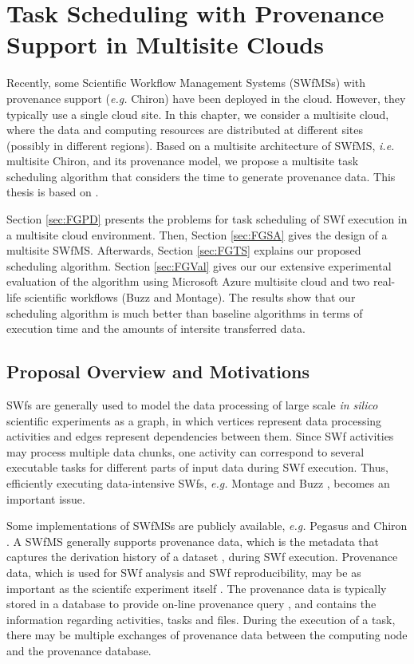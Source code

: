 \chapter{Task Scheduling with Provenance Support in Multisite Clouds} \label{SWSPSMC}

Recently, some Scientific Workflow Management Systems (SWfMSs) with provenance support (\textit{e.g.} Chiron) have been deployed in the cloud.
However,  they typically use a single cloud site. In this chapter, we consider a multisite cloud, where the data and computing resources are distributed at different sites (possibly in different regions).
Based on a multisite architecture of SWfMS, \textit{i.e.} multisite Chiron, and its provenance model, we propose a multisite task scheduling algorithm that considers the time to generate provenance data. This thesis is based on \cite{Liu2016}.

Section \ref{sec:FGPD} presents the problems for task scheduling of SWf execution in a multisite cloud environment. 
Then, Section \ref{sec:FGSA} gives the design of a multisite SWfMS. 
Afterwards, Section \ref{sec:FGTS} explains our proposed scheduling algorithm. 
Section \ref{sec:FGVal} gives our our extensive experimental evaluation of the algorithm using Microsoft Azure
multisite cloud and two real-life scientific workflows (Buzz and Montage). 
The results show that our scheduling algorithm is much better than baseline algorithms in terms of execution time and the amounts of intersite transferred data.

\section{Proposal Overview and Motivations}

SWfs are generally used to model the data processing of large scale \textit{in silico} scientific experiments as a graph, in which vertices represent data processing activities and edges represent dependencies between them. 
Since SWf activities may process multiple data chunks, one activity can correspond to several executable tasks for different parts of input data during SWf execution.
Thus, efficiently executing data-intensive SWfs, \textit{e.g.} Montage \cite{Montage} and Buzz \cite{Dias2013}, becomes an important issue. 

Some implementations of SWfMSs are publicly available, \textit{e.g.} Pegasus  \cite{Deelman2005} and Chiron \cite{Ogasawara2013}. 
A SWfMS generally supports provenance data, which is the metadata that captures the derivation history of a dataset \cite{Liu2015}, during SWf execution.
Provenance data, which is used for SWf analysis and SWf reproducibility, may be as important as the scientifc experiment itself \cite{Liu2015}. The provenance data is typically stored in a database to provide on-line provenance query \cite{Mattoso2014}, and contains the information regarding activities, tasks and files. During the execution of a task, there may be multiple exchanges of provenance data between the computing node and the provenance database. 



